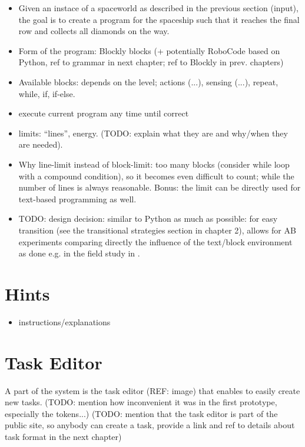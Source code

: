 \begin{itemize}
\item Given an instace of a spaceworld as described in the previous section
(input), the goal is to create a program for the spaceship such that it reaches
the final row and collects all diamonds on the way.
\item Form of the program: Blockly blocks (+ potentially RoboCode based on
Python, ref to grammar in next chapter; ref to Blockly in prev. chapters)
\item Available blocks: depends on the level;
  actions (...), sensing (...), repeat, while, if, if-else.
\item execute current program any time until correct
\item limits: ``lines'', energy.
  (TODO: explain what they are and why/when they are needed).
\item Why line-limit instead of block-limit: too many blocks (consider while
  loop with a compound condition), so it becomes even difficult to count;
  while the number of lines is always reasonable.
  Bonus: the limit can be directly used for text-based programming as well.
\item TODO: design decision: similar to Python as much as possible: for easy transition
(see the transitional strategies section in chapter 2), allows for AB experiments
comparing directly the influence of the text/block environment as done e.g.
in the field study in \cite{comparing-blocks-text-weintrop2017}.
\end{itemize}



\section{Hints}
\begin{itemize}
\item instructions/explanations
\end{itemize}



\section{Task Editor}  %
\label{sec:robomission.task-editor}

A part of the system is the task editor (REF: image)
that enables to easily create new tasks.
(TODO: mention how inconvenient it was in the first prototype, especially the tokens...)
(TODO: mention that the task editor is part of the public site, so anybody can create a task, provide a link and ref to details about task format in the next chapter)


